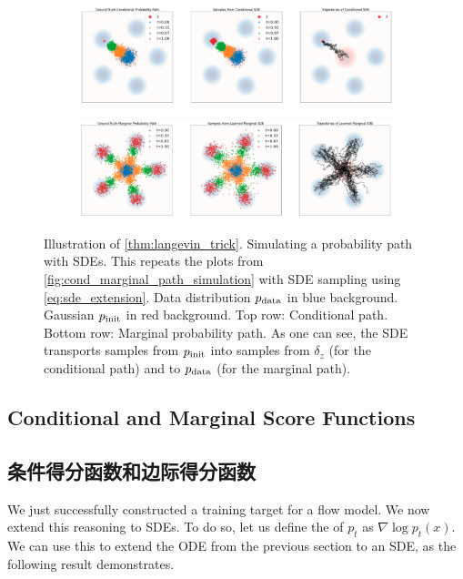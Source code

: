 \begin{figure}[t!]
\centering
   \begin{subfigure}[b]{\textwidth}
   \centering
   \includegraphics[width=\textwidth]{figures/conditional_sde.png}
   \label{fig:Ng1} 
\end{subfigure}
\begin{subfigure}[b]{\textwidth}
    \centering
   \includegraphics[width=\textwidth]{figures/marginal_sde.png}
   \label{fig:Ng2}
\end{subfigure}
\caption{\label{fig:thm_sde_extension}Illustration of \cref{thm:langevin_trick}. Simulating a probability path with SDEs. This repeats the plots from \cref{fig:cond_marginal_path_simulation} with SDE sampling using \cref{eq:sde_extension}. Data distribution $p_{\rm{data}}$ in blue background. Gaussian $p_{\rm{init}}$ in red background. Top row: Conditional path. Bottom row: Marginal probability path. As one can see, the SDE transports samples from $p_{\rm{init}}$ into samples from $\delta_{z}$ (for the conditional path) and to $p_{\rm{data}}$ (for the marginal path).}
\end{figure}

\subsection{Conditional and Marginal Score Functions}

\subsection{条件得分函数和边际得分函数}

We just successfully constructed a training target for a flow model. We now extend this reasoning to SDEs. To do so, let us define the  of $p_t$ as $\nabla\log p_t(x)$. We can use this to extend the ODE from the previous section to an SDE, as the following result demonstrates.

